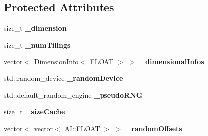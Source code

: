 \subsection*{Protected Attributes}
\begin{DoxyCompactItemize}
\item 
\hypertarget{classAI_1_1Algorithm_1_1TileCode_a3f5b849919d62c2167d28e06efcadb3b}{size\-\_\-t {\bfseries \-\_\-dimension}}\label{classAI_1_1Algorithm_1_1TileCode_a3f5b849919d62c2167d28e06efcadb3b}

\item 
\hypertarget{classAI_1_1Algorithm_1_1TileCode_ae45e259692f779b3d6881e74a3c944c5}{size\-\_\-t {\bfseries \-\_\-num\-Tilings}}\label{classAI_1_1Algorithm_1_1TileCode_ae45e259692f779b3d6881e74a3c944c5}

\item 
\hypertarget{classAI_1_1Algorithm_1_1TileCode_af55344828d37574d90f9bb0ed939cdba}{vector$<$ \hyperlink{classAI_1_1Algorithm_1_1DimensionInfo}{Dimension\-Info}$<$ \hyperlink{namespaceAI_a41b74884a20833db653dded3918e05c3}{F\-L\-O\-A\-T} $>$ $>$ {\bfseries \-\_\-dimensional\-Infos}}\label{classAI_1_1Algorithm_1_1TileCode_af55344828d37574d90f9bb0ed939cdba}

\item 
\hypertarget{classAI_1_1Algorithm_1_1TileCode_a8b690cd8628f8772856ab914d8469f03}{std\-::random\-\_\-device {\bfseries \-\_\-random\-Device}}\label{classAI_1_1Algorithm_1_1TileCode_a8b690cd8628f8772856ab914d8469f03}

\item 
\hypertarget{classAI_1_1Algorithm_1_1TileCode_ae0ac4ab46768a4c60c0470851b974d92}{std\-::default\-\_\-random\-\_\-engine {\bfseries \-\_\-pseudo\-R\-N\-G}}\label{classAI_1_1Algorithm_1_1TileCode_ae0ac4ab46768a4c60c0470851b974d92}

\item 
\hypertarget{classAI_1_1Algorithm_1_1TileCode_a846472b750151c7478d5e0ebe48211b0}{size\-\_\-t {\bfseries \-\_\-size\-Cache}}\label{classAI_1_1Algorithm_1_1TileCode_a846472b750151c7478d5e0ebe48211b0}

\item 
\hypertarget{classAI_1_1Algorithm_1_1TileCode_a4a452f9c6cca4dace8c067fd24128584}{vector$<$ vector$<$ \hyperlink{namespaceAI_a41b74884a20833db653dded3918e05c3}{A\-I\-::\-F\-L\-O\-A\-T} $>$ $>$ {\bfseries \-\_\-random\-Offsets}}\label{classAI_1_1Algorithm_1_1TileCode_a4a452f9c6cca4dace8c067fd24128584}

\end{DoxyCompactItemize}



